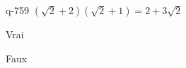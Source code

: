 \begin{truefalse}{q-759}
$(\sqrt{2}+2)(\sqrt{2}+1)=2+3\sqrt{2}$
\item Vrai
\item* Faux
\end{truefalse}

